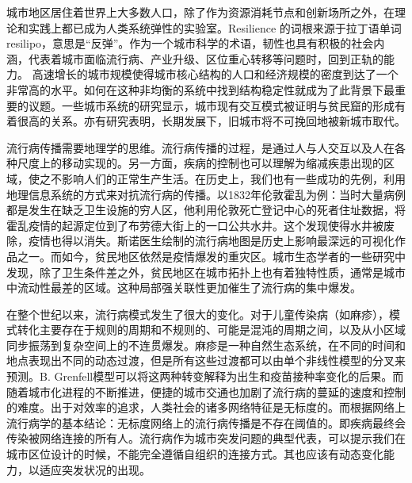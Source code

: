 城市地区居住着世界上大多数人口，除了作为资源消耗节点和创新场所之外，在理论和实践上都已成为人类系统弹性的实验室\cite{meerow2016defining}。Resilience 的词根来源于拉丁语单词 resilipo，意思是“反弹”。作为一个城市科学的术语，韧性也具有积极的社会内涵，代表着城市面临流行病、产业升级、区位重心转移等问题时，回到正轨的能力\cite{mcevoy2013resilience, o2013deconstructing}。
高速增长的城市规模使得城市核心结构的人口和经济规模的密度到达了一个非常高的水平。如何在这种非均衡的系统中找到结构稳定性就成为了此背景下最重要的议题。一些城市系统的研究显示，城市现有交互模式被证明与贫民窟的形成有着很高的关系\cite{brelsford2018toward}。亦有研究表明，长期发展下，旧城市将不可挽回地被新城市取代\cite{fujita1997structural, cottineau2017diverse}。

流行病传播需要地理学的思维。流行病传播的过程，是通过人与人交互以及人在各种尺度上的移动实现的\cite{belik2011natural}。另一方面，疾病的控制也可以理解为缩减疾患出现的区域，使之不影响人们的正常生产生活。在历史上，我们也有一些成功的先例，利用地理信息系统的方式来对抗流行病的传播。以1832年伦敦霍乱为例：当时大量病例都是发生在缺乏卫生设施的穷人区，他利用伦敦死亡登记中心的死者住址数据，将霍乱疫情的起源定位到了布劳德大街上的一口公共水井。这个发现使得水井被废除，疫情也得以消失。斯诺医生绘制的流行病地图是历史上影响最深远的可视化作品之一。而如今，贫民地区依然是疫情爆发的重灾区\cite{sahasranaman2021spread}。城市生态学者的一些研究中发现，除了卫生条件差之外，贫民地区在城市拓扑上也有着独特性质，通常是城市中流动性最差的区域\cite{brelsford2018toward}。这种局部强关联性更加催生了流行病的集中爆发。

在整个世纪以来，流行病模式发生了很大的变化。对于儿童传染病（如麻疹），模式转化主要存在于规则的周期和不规则的、可能是混沌的周期之间，以及从小区域同步振荡到复杂空间上的不连贯爆发。麻疹是一种自然生态系统，在不同的时间和地点表现出不同的动态过渡，但是所有这些过渡都可以由单个非线性模型的分叉来预测。B. Grenfell模型\cite{earn2000a}可以将这两种转变解释为出生和疫苗接种率变化的后果。而随着城市化进程的不断推进，便捷的城市交通也加剧了流行病的蔓延的速度和控制的难度。出于对效率的追求，人类社会的诸多网络特征是无标度的。而根据网络上流行病学的基本结论：无标度网络上的流行病传播是不存在阈值的。即疾病最终会传染被网络连接的所有人\cite{eguiluz2002epidemic, plucinski2013clusters}。流行病作为城市突发问题的典型代表，可以提示我们在城市区位设计的时候，不能完全遵循自组织的连接方式。其也应该有动态变化能力，以适应突发状况的出现。


